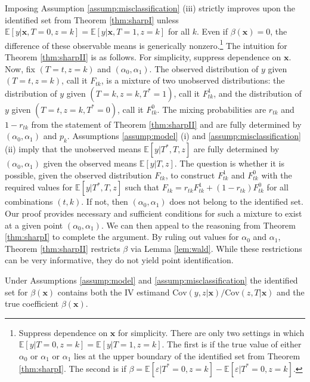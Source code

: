 Imposing Assumption \ref{assump:misclassification} (iii) strictly improves upon the identified set from Theorem \ref{thm:sharpI} unless $\mathbb{E}[y|\mathbf{x},T=0,z=k]=\mathbb{E}[y|\mathbf{x},T=1,z=k]$ for all $k$. 
Even if $\beta(\mathbf{x}) = 0$, the difference of these observable means is generically nonzero.\footnote{Suppress dependence on $\mathbf{x}$ for simplicity.
There are only two settings in which $\mathbb{E}[y|T=0,z=k] = \mathbb{E}[y|T=1,z=k]$.
The first is if the true value of either $\alpha_0$ or $\alpha_1$ or $\alpha_1$ lies at the upper boundary of the identified set from Theorem \ref{thm:sharpI}.
The second is if $\beta = \mathbb{E}[\varepsilon|T^*=0,z=k] - \mathbb{E}[\varepsilon|T^*=0,z=k]$.}
The intuition for Theorem \ref{thm:sharpII} is as follows.
For simplicity, suppress dependence on $\mathbf{x}$.
Now, fix $(T=t, z=k)$ and $(\alpha_0, \alpha_1)$.
The observed distribution of $y$ given $(T=t,z=k)$, call it $F_{tk}$, is a mixture of two unobserved distributions: the distribution of $y$ given $(T=k,z=k,T^*=1)$, call it $F^1_{tk}$, and the distribution of $y$ given $(T=t,z=k,T^*=0)$, call it $F^{0}_{tk}$.
The mixing probabilities are $r_{tk}$ and $1-r_{tk}$ from the statement of Theorem \ref{thm:sharpII} and are fully determined by $(\alpha_0, \alpha_1)$ and $p_k$.
Assumptions \ref{assump:model} (i) and \ref{assump:misclassification} (ii) imply that the unobserved means $\mathbb{E}[y|T^*,T,z]$  are fully determined by $(\alpha_0, \alpha_1)$ given the observed means $\mathbb{E}[y|T,z]$.
The question is whether it is possible, given the observed distribution $F_{tk}$, to construct $F^1_{tk}$ and $F^{0}_{tk}$ with the required values for $\mathbb{E}[y|T^*,T,z]$ such that $F_{tk} = r_{tk} F^{1}_{tk} + (1 - r_{tk}) F^{0}_{tk}$ for all combinations $(t,k)$. 
If not, then $(\alpha_0, \alpha_1)$ does not belong to the identified set.
Our proof provides necessary and sufficient conditions for such a mixture to exist at a given point $(\alpha_0, \alpha_1)$.
We can then appeal to the reasoning from Theorem \ref{thm:sharpI} to complete the argument.
By ruling out values for $\alpha_0$ and $\alpha_1$, Theorem \ref{thm:sharpII} restricts $\beta$ via Lemma \ref{lem:wald}. 
While these restrictions can be very informative,  they do not yield point identification.

\begin{cor}
  Under Assumptions \ref{assump:model} and \ref{assump:misclassification} the identified set for $\beta(\mathbf{x})$ contains both the IV estimand $\mbox{Cov}(y,z|\mathbf{x})/\mbox{Cov}(z,T|\mathbf{x})$ and the true coefficient $\beta(\mathbf{x})$.
  \label{cor:nonident}
\end{cor}

